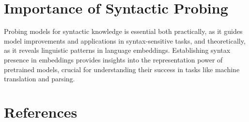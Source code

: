 \documentclass[11pt]{article}
\begin{document}
\section*{Importance of Syntactic Probing}
Probing models for syntactic knowledge is essential both practically, as it guides model improvements and applications in syntax-sensitive tasks, and theoretically, as it reveals linguistic patterns in language embeddings. Establishing syntax presence in embeddings provides insights into the representation power of pretrained models, crucial for understanding their success in tasks like machine translation and parsing.

\section*{References}
\end{document}
